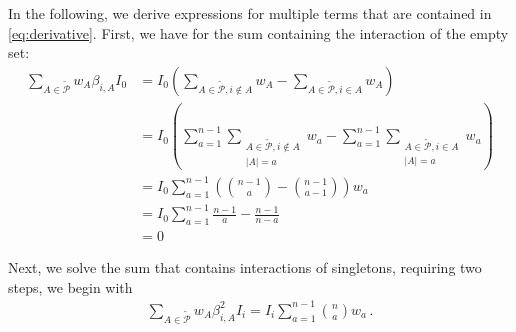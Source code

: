 In the following, we derive expressions for multiple terms that are contained in \cref{eq:derivative}.
First, we have for the sum containing the interaction of the empty set:
\begin{equation} \label{eq:Izero}
	\begin{array}{rll}
		\sum\limits_{A \in \tilde{\mathcal{P}}} w_A \beta_{i,A} I_0 & = I_0 \left( \sum\limits_{A \in \tilde{\mathcal{P}}, i \notin A} w_A  - \sum\limits_{A \in \tilde{\mathcal{P}}, i \in A} w_A \right) \\
        & = I_0 \left( \sum\limits_{a=1}^{n-1} \sum\limits_{\substack{A \in \tilde{\mathcal{P}}, i \notin A \\ |A|=a}} w_a  - \sum\limits_{a=1}^{n-1} \sum\limits_{\substack{A \in \tilde{\mathcal{P}}, i \in A \\ |A|=a}} w_a \right) \\
        & = I_0 \sum\limits_{a=1}^{n-1} \left( \binom{n-1}{a} - \binom{n-1}{a-1} \right) w_a \\
        & = I_0 \sum\limits_{a=1}^{n-1} \frac{n-1}{a} - \frac{n-1}{n-a} \\
        & = 0
	\end{array}
\end{equation}

Next, we solve the sum that contains interactions of singletons, requiring two steps, we begin with
\begin{equation} \label{eq:shapleys_same}
    \begin{array}{rll}
        \sum\limits_{A \in \tilde{\mathcal{P}}} w_A \beta_{i,A}^2 I_i = I_i \sum\limits_{a=1}^{n-1} \binom{n}{a} w_a \, .
    \end{array}
\end{equation}


